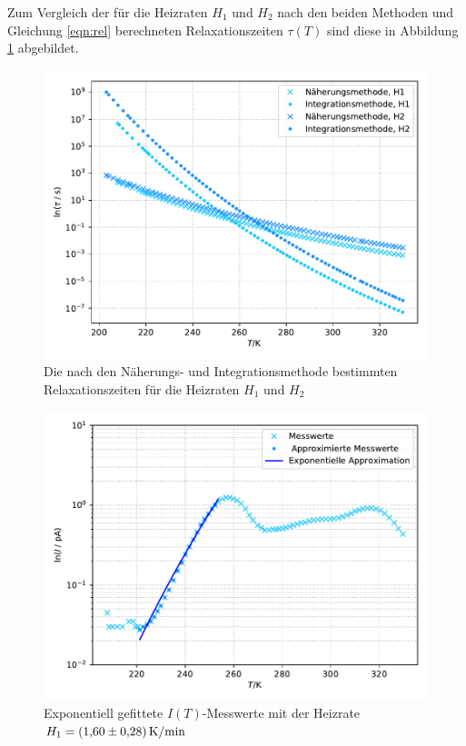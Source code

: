 Zum Vergleich der für die Heizraten $H_1$ und $H_2$ nach den beiden Methoden und Gleichung \eqref{eqn:rel} berechneten 
Relaxationszeiten $\tau(T)$ sind diese in Abbildung \ref{fig:plot5} abgebildet.

\begin{figure}[H]
  \centering
  \includegraphics[scale=0.75]{content/plot5.pdf}
  \caption{Die nach den Näherungs- und Integrationsmethode bestimmten Relaxationszeiten für die Heizraten $H_1$ und $H_2$}
  \label{fig:plot5}
\end{figure}





\begin{figure}[H]
  \centering
  \includegraphics[scale=0.7]{content/plot1.pdf}
  \caption{Exponentiell gefittete $I(T)$-Messwerte mit der Heizrate $H_1 = \SI{1.60 +- 0.28}{\kelvin\per\minute}$}
  \label{fig:plot1}
\end{figure}

